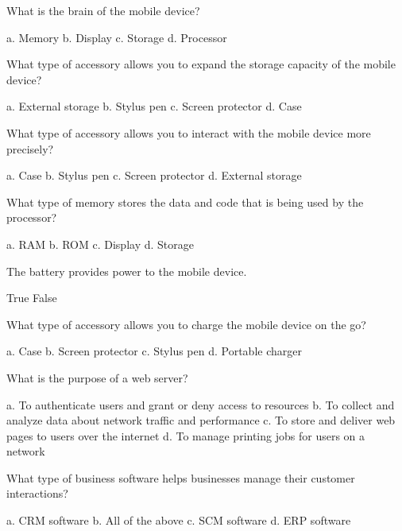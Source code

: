 \documentclass{exam}
\begin{document}
\begin{questions}
\question What is the brain of the mobile device?
\begin{checkboxes}
\choice a. Memory
\choice b. Display
\choice c. Storage
\CorrectChoice d. Processor
\end{checkboxes}

\question What type of accessory allows you to expand the storage capacity of the mobile device?
\begin{checkboxes}
\CorrectChoice a. External storage
\choice b. Stylus pen
\choice c. Screen protector
\choice d. Case
\end{checkboxes}

\question What type of accessory allows you to interact with the mobile device more precisely?
\begin{checkboxes}
\choice a. Case
\CorrectChoice b. Stylus pen
\choice c. Screen protector
\choice d. External storage
\end{checkboxes}

\question What type of memory stores the data and code that is being used by the processor?
\begin{checkboxes}
\CorrectChoice a. RAM
\choice b. ROM
\choice c. Display
\choice d. Storage
\end{checkboxes}

\question The battery provides power to the mobile device.
\begin{checkboxes}
\CorrectChoice True
\choice False
\end{checkboxes}

\question What type of accessory allows you to charge the mobile device on the go?
\begin{checkboxes}
\choice a. Case
\choice b. Screen protector
\choice c. Stylus pen
\CorrectChoice d. Portable charger
\end{checkboxes}

\question What is the purpose of a web server?
\begin{checkboxes}
\choice a. To authenticate users and grant or deny access to resources
\choice b. To collect and analyze data about network traffic and performance
\CorrectChoice c. To store and deliver web pages to users over the internet
\choice d. To manage printing jobs for users on a network
\end{checkboxes}

\question What type of business software helps businesses manage their customer interactions?
\begin{checkboxes}
\CorrectChoice a. CRM software
\choice b. All of the above
\choice c. SCM software
\choice d. ERP software
\end{checkboxes}


\end{questions}
\end{document}
